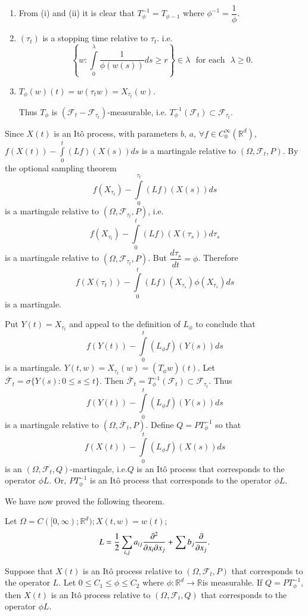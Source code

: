 \begin{enumerate}
\renewcommand{\theenumi}{\roman{enumi}}
\renewcommand{\labelenumi}{(\theenumi)}
\setcounter{enumi}{2}
\item From (i) and (ii) it is clear that $T^{-1}_{\phi}=T_{\phi-1}$
  where $\phi^{-1}=\dfrac{1}{\phi}$.

\item $(\tau_{t})$ is a stopping time relative to $\tau_{t}$. i.e.\@
$$
\left\{w:\int\limits^{\lambda}_{0}\frac{1}{\phi(w(s))}ds\geq
r\right\}\in \lambda \text{~ for each~ }\lambda\geq 0.
$$

\item $T_{\phi}(w)(t)=w(\tau_{t}w)=X_{\tau_{t}}(w)$.

Thus $T_{\phi}$ is
$(\mathscr{F}_{t}-\mathscr{F}_{\tau_{t}})$-measurable, i.e.\@
$T^{-1}_{\phi}(\mathscr{F}_{t})\subset \mathscr{F}_{\tau_{t}}$.
\end{enumerate}

Since $X(t)$ is an It\^o process, with parameters $b$, $a$, $\forall
f\in C^{\infty}_{0}(\mathbb{R}^{d})$,
$f(X(t))-\int\limits^{t}_{0}(Lf)(X(s))ds$ is a martingale relative to
$(\Omega,\mathscr{F}_{t},P)$. By the optional sampling theorem
$$
f(X_{\tau_{t}})-\int\limits^{\tau_{t}}_{0}(Lf)(X(s))ds
$$
is a martingale relative to $(\Omega,\mathscr{F}_{\tau_{t}},P)$, i.e.
$$
f(X_{\tau_{t}})-\int\limits^{t}_{0}(Lf)(X(\tau_{s}))d\tau_{s}
$$
is a martingale relative to $(\Omega,\mathscr{F}_{\tau_{t}},P)$. But
$\dfrac{d\tau_{s}}{dt}=\phi$. Therefore 
$$
f(X(\tau_{t}))-\int\limits^{t}_{0}(Lf)(X_{\tau_{s}})\phi(X_{\tau_{s}})ds
$$\pageoriginale
is a martingale.

Put $Y(t)=X_{\tau_{t}}$ and appeal to the definition of $L_{\phi}$ to
conclude that
$$
f(Y(t))-\int\limits^{t}_{0}(L_{\phi}f)(Y(s))ds
$$
is a martingale. $Y(t,w)=X_{\tau_{t}}(w)=(T_{\phi}w)(t)$. Let
$\overline{\mathscr{F}}_{t}=\sigma\{Y(s):0\leq s\leq t\}$. Then
  $\overline{\mathscr{F}}_{t}=T^{-1}_{\phi}(\mathscr{F}_{t})\subset
    \mathscr{F}_{\tau_{t}}$. Thus
$$
f(Y(t))-\int\limits^{t}_{0}(L_{\phi}f)(Y(s))ds
$$
is a martingale relative to
$(\Omega,\overline{\mathscr{F}}_{t},P)$. Define $Q=PT^{-1}_{\phi}$ so
that
$$
f(X(t))-\int\limits^{t}_{0}(L_{\phi}f)(X(s))ds
$$
is an $(\Omega,\mathscr{F}_{t},Q)$-martingale, i.e.\@ $Q$ is an It\^o
process that corresponds to the operator $\phi L$. Or,
$PT^{-1}_{\phi}$ is an It\^o process that corresponds to the operator
$\phi L$.

We have now proved the following theorem.

\begin{theorem*}
Let $\Omega=C([0,\infty);\mathbb{R}^{d});X(t,w)=w(t)$;
$$
L=\frac{1}{2}\sum_{i,j}a_{ij}\frac{\partial^{2}}{\partial x_{i}\partial x_{j}}+\sum
b_{j}\frac{\partial}{\partial x_{j}}.
$$

Suppose that $X(t)$ is an It\^o process relative to
$(\Omega,\mathscr{F}_{t},P)$ that corresponds to the operator $L$. Let $0\leq
C_{1}\leq \phi\leq C_{2}$ where $\phi:\mathbb{R}^{d}\to
\mathbb{R}$\pageoriginale  is
measurable. If $Q=PT^{-1}_{\phi}$, then $X(t)$ is an It\^o process
relative to $(\Omega,\mathscr{F}_{t},Q)$ that corresponds to the
operator $\phi L$.
\end{theorem*}

